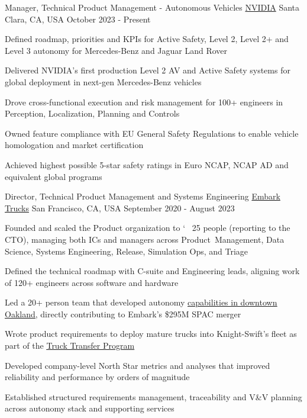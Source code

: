 \vspace{-0.7mm}
\begin{center}
  \vspace{-1.5mm}
  \cventry
    {Manager, Technical Product Management - Autonomous Vehicles}
    {\href{https://www.nvidia.com/en-us/}{NVIDIA}}
    {Santa Clara, CA, USA}
    {October 2023 - Present}
    {
      \begin{cvitems}
        \item {Defined roadmap, priorities and KPIs for Active Safety, Level 2, Level 2+ and Level 3 autonomy for Mercedes-Benz and Jaguar Land Rover}
        \item {Delivered NVIDIA's first production Level 2 AV and Active Safety systems for global deployment in next-gen Mercedes-Benz vehicles}
        \item {Drove cross-functional execution and risk management for 100+ engineers in Perception, Localization, Planning and Controls}
        \item {Owned feature compliance with EU General Safety Regulations to enable vehicle homologation and market certification}
        \item {Achieved highest possible 5-star safety ratings in Euro NCAP, NCAP AD and equivalent global programs}
      \end{cvitems}
    }
\end{center}
\begin{center}
  \vspace{-3.4mm}
  \cventry
    {Director, Technical Product Management and Systems Engineering}
    {\href{https://embarktrucks.com}{Embark Trucks}}
    {San Francisco, CA, USA}
    {September 2020 - August 2023}
    {
      \begin{cvitems}
        \item {Founded and scaled the Product organization to \char`~ 25 people (reporting to the CTO), managing both ICs and managers across \mbox{Product Management}, Data Science, Systems Engineering, Release, Simulation Ops, and Triage}
        \item {Defined the technical roadmap with C-suite and Engineering leads, aligning work of 120+ engineers across software and hardware}
        \item {Led a 20+ person team that developed autonomy \href{https://www.youtube.com/watch?v=6-02xycYbws}{\underline{capabilities in downtown Oakland}}, directly contributing to Embark's \$295M SPAC merger}
        \item {Wrote product requirements to deploy mature trucks into Knight-Swift's fleet as part of the \href{https://www.youtube.com/watch?v=CBnEjgEuQuA}{\underline{Truck Transfer Program}}}
        \item {Developed company-level North Star metrics and analyses that improved reliability and performance by orders of magnitude}
        \item {Established structured requirements management, traceability and V\&V planning across autonomy stack and supporting services}
      \end{cvitems} 
    }
\end{center}
